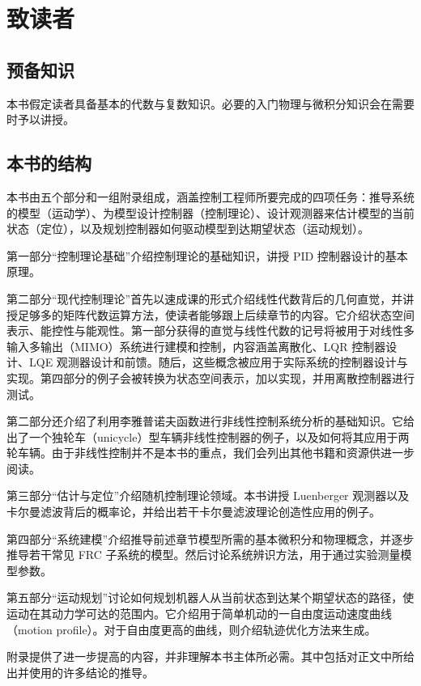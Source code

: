 ﻿
\chapter{致读者}

\section{预备知识}
本书假定读者具备基本的代数与复数知识。必要的入门物理与微积分知识会在需要时予以讲授。

\section{本书的结构}
\label{sec:structure}
本书由五个部分和一组附录组成，涵盖控制工程师所要完成的四项任务：推导系统的模型（运动学）、为模型设计控制器（控制理论）、设计观测器来估计模型的当前状态（定位），以及规划控制器如何驱动模型到达期望状态（运动规划）。

第一部分``控制理论基础''介绍控制理论的基础知识，讲授 PID 控制器设计的基本原理。

第二部分``现代控制理论''首先以速成课的形式介绍线性代数背后的几何直觉，并讲授足够多的矩阵代数运算方法，使读者能够跟上后续章节的内容。它介绍状态空间表示、能控性与能观性。第一部分获得的直觉与线性代数的记号将被用于对线性多输入多输出（MIMO）系统进行建模和控制，内容涵盖离散化、LQR 控制器设计、LQE 观测器设计和前馈。随后，这些概念被应用于实际系统的控制器设计与实现。第四部分的例子会被转换为状态空间表示，加以实现，并用离散控制器进行测试。

第二部分还介绍了利用李雅普诺夫函数进行非线性控制系统分析的基础知识。它给出了一个独轮车（unicycle）型车辆非线性控制器的例子，以及如何将其应用于两轮车辆。由于非线性控制并不是本书的重点，我们会列出其他书籍和资源供进一步阅读。

第三部分``估计与定位''介绍随机控制理论领域。本书讲授 Luenberger 观测器以及卡尔曼滤波背后的概率论，并给出若干卡尔曼滤波理论创造性应用的例子。

第四部分``系统建模''介绍推导前述章节模型所需的基本微积分和物理概念，并逐步推导若干常见 FRC 子系统的模型。然后讨论系统辨识方法，用于通过实验测量模型参数。

第五部分``运动规划''讨论如何规划机器人从当前状态到达某个期望状态的路径，使运动在其动力学可达的范围内。它介绍用于简单机动的一自由度运动速度曲线（motion profile）。对于自由度更高的曲线，则介绍轨迹优化方法来生成。

附录提供了进一步提高的内容，并非理解本书主体所必需。其中包括对正文中所给出并使用的许多结论的推导。

